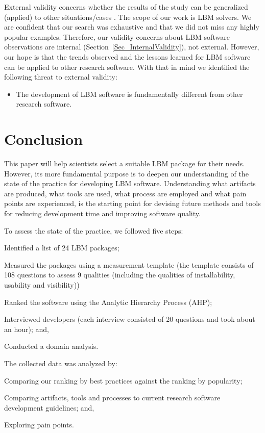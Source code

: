 \documentclass[final, 3p, times, authoryear]{elsarticle}
\begin{document}
External validity concerns whether the results of the study can be generalized
(applied) to other situations/cases \citep{AmpatzoglouEtAl2019}.  The scope of
our work is LBM solvers.  We are confident that our search was exhaustive and
that we did not miss any highly popular examples.  Therefore, our validity
concerns about LBM software observations are internal
(Section~\ref{Sec_InternalValidity}), not external.  However, our hope is that
the trends observed and the lessons learned for LBM software can be applied to
other research software.  With that in mind we identified the following threat
to external validity:

\begin{itemize}
\item The development of LBM software is fundamentally different from other
research software.
\end{itemize}

\section{Conclusion} \label{conclusion}

This paper will help scientists select a suitable LBM package for their needs.
However, its more fundamental purpose is to deepen our understanding of the
state of the practice for developing LBM software. Understanding what artifacts
are produced, what tools are used, what process are employed and what pain
points are experienced, is the starting point for devising future methods and
tools for reducing development time and improving software quality. 

To assess the state of the practice, we followed five steps:
\begin{inparaenum}[i)]
	\item Identified a list of 24 LBM packages;
	\item Measured the packages using a measurement template (the template
	consists of 108 questions to assess 9 qualities (including the qualities of
	installability, usability and visibility))
	\item Ranked the software using the Analytic Hierarchy Process (AHP);
	\item Interviewed developers (each interview consisted of 20 questions and took
	about an hour); and, 
	\item Conducted a domain analysis. 
\end{inparaenum}
The collected data was analyzed by: 
\begin{inparaenum}[i)]
	\item Comparing our ranking by best practices against the ranking by
	popularity;
	\item Comparing artifacts, tools and processes to current research software
	development guidelines; and, 
	\item Exploring pain points.
\end{inparaenum}
\end{document}

